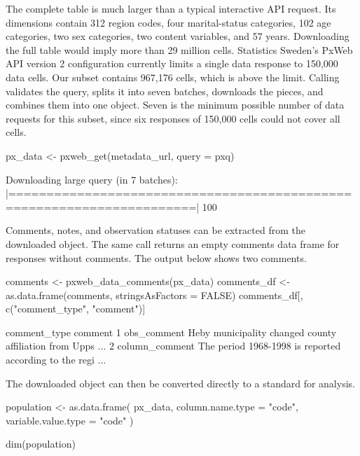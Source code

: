 The complete table is much larger than a typical interactive API request.
Its dimensions contain 312 region codes, four marital-status categories, 102 age categories, two sex categories, two content variables, and 57 years.
Downloading the full table would imply more than 29 million cells.
Statistics Sweden's PxWeb API version 2 configuration currently limits a single data response to 150,000 data cells.
Our subset contains 967,176 cells, which is above the limit.
Calling  validates the query, splits it into seven batches, downloads the pieces, and combines them into one  object.
Seven is the minimum possible number of data requests for this subset, since six responses of 150,000 cells could not cover all cells.

\begin{example}
px_data <- pxweb_get(metadata_url, query = pxq)
\end{example}

\begin{example}
Downloading large query (in 7 batches):
|======================================================================| 100%
\end{example}

Comments, notes, and observation statuses can be extracted from the downloaded object.
The same call returns an empty comments data frame for responses without comments.
The output below shows two comments.

\begin{example}
comments <- pxweb_data_comments(px_data)
comments_df <- as.data.frame(comments, stringsAsFactors = FALSE)
comments_df[, c("comment_type", "comment")]
\end{example}

\begin{example}
    comment_type    comment
1    obs_comment    Heby municipality changed county affiliation from Upps ...
2 column_comment    The period 1968-1998 is reported according to the regi ...
\end{example}

The downloaded object can then be converted directly to a standard  for analysis.

\begin{example}
population <- as.data.frame(
  px_data,
  column.name.type = "code",
  variable.value.type = "code"
)

dim(population)
\end{example}

